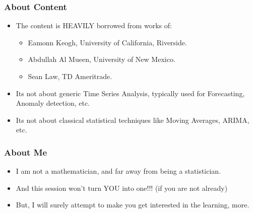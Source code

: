  \begin{frame}[fragile]\frametitle{About Content}
\begin{itemize}
\item The content is HEAVILY borrowed from works of:
\begin{itemize}
\item Eamonn Keogh, University of California, Riverside.
\item Abdullah Al Mueen, University of New Mexico.
\item Sean Law, TD Ameritrade. 
\end{itemize}
\item Its not about generic Time Series Analysis, typically used for Forecasting, Anomaly detection, etc.
\item Its not about classical statistical techniques like Moving Averages, ARIMA, etc.
\end{itemize}
\end{frame}

 \begin{frame}[fragile]\frametitle{About Me}
\begin{itemize}
\item I am not a mathematician, and far away from being a statistician.
\item And this session won't turn YOU into one!!! (if you are not already)
\item But, I will surely attempt to make you get interested in the learning, more.
\end{itemize}
\end{frame}

